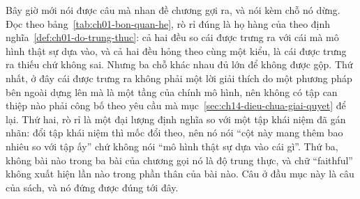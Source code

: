%
Bây giờ mới nói được câu mà nhan đề chương gợi ra, và nói kèm chỗ nó dừng. Đọc
theo bảng~\ref{tab:ch01-bon-quan-he}, rò rỉ đúng là họ hàng của
theo định nghĩa~\ref{def:ch01-do-trung-thuc}: cả hai đều so cái được trưng ra
với cái mà mô hình thật sự dựa vào, và cả hai đều hỏng theo cùng một kiểu, là
cái được trưng ra thiếu chứ không sai. Nhưng ba chỗ khác nhau đủ lớn để không
được gộp. Thứ nhất, ở đây cái được trưng ra không phải một lời giải thích do một
phương pháp bên ngoài dựng lên mà là một tầng của chính mô hình, nên không có
tập can thiệp nào phải công bố theo yêu cầu mà
mục~\ref{sec:ch14-dieu-chua-giai-quyet} để lại. Thứ hai, rò rỉ là một đại lượng
định nghĩa so với một tập khái niệm đã gán nhãn: đổi tập khái niệm thì mốc đổi
theo, nên nó nói \enquote{cột này mang thêm bao nhiêu so với tập ấy} chứ không
nói \enquote{mô hình thật sự dựa vào cái gì}. Thứ ba, không bài nào trong ba bài
của chương gọi nó là độ trung thực, và chữ \enquote{faithful} không xuất hiện
lần nào trong phần thân của bài nào. Câu ở đầu mục này là câu của sách, và nó
đứng được đúng tới đây.

